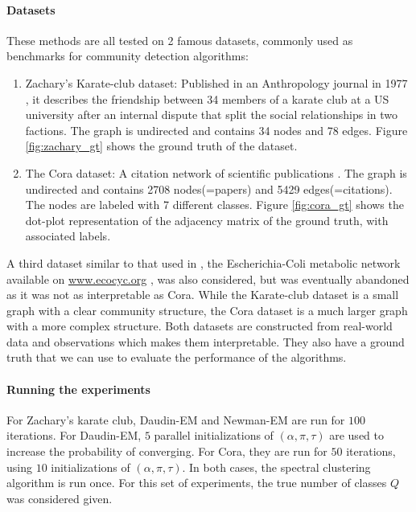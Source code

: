 \documentclass[switch, 12pt]{article}
\begin{document}
\begin{multicols}{2}
    \paragraph{Datasets}
    These methods are all tested on 2 famous datasets, commonly used as benchmarks for community detection algorithms:
    \begin{enumerate}
        \item Zachary's Karate-club dataset: Published in an Anthropology journal in 1977 \cite{karate}, it describes the friendship between 34 members of a karate club at a US university after an internal dispute that split the social relationships in two factions. The graph is undirected and contains 34 nodes and 78 edges. Figure \ref{fig:zachary_gt} shows the ground truth of the dataset.
        \item The Cora dataset: A citation network of scientific publications \cite{cora}. The graph is undirected and contains 2708 nodes(=papers) and 5429 edges(=citations). The nodes are labeled with 7 different classes. Figure \ref{fig:cora_gt} shows the dot-plot representation of the adjacency matrix of the ground truth, with associated labels.
    \end{enumerate}
    A third dataset similar to that used in \cite{main_article}, the Escherichia-Coli metabolic network available on \href{www.ecocyc.org}{www.ecocyc.org} \cite{keseler_ecocyc_2021}, was also considered, but was eventually abandoned as it was not as interpretable as Cora. While the Karate-club dataset is a small graph with a clear community structure, the Cora dataset is a much larger graph with a more complex structure. Both datasets are constructed from real-world data and observations which makes them interpretable. They also have a ground truth that we can use to evaluate the performance of the algorithms.

    \paragraph{Running the experiments} For Zachary's karate club, Daudin-EM and Newman-EM are run for $100$ iterations. For Daudin-EM, $5$ parallel initializations of $(\alpha, \pi, \tau)$ are used to increase the probability of converging.
    For Cora, they are run for $50$ iterations, using $10$ initializations of $(\alpha, \pi, \tau)$.
    In both cases, the spectral clustering algorithm is run once. For this set of experiments, the true number of classes $Q$ was considered given.


\end{multicols}
\end{document}
